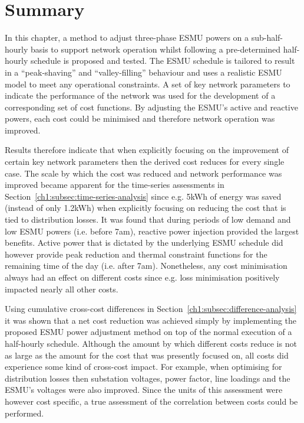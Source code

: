 \section{Summary}
\label{ch1:sec:summary}

In this chapter, a method to adjust three-phase ESMU powers on a sub-half-hourly basis to support network operation whilst following a pre-determined half-hourly schedule is proposed and tested.
The ESMU schedule is tailored to result in a ``peak-shaving'' and ``valley-filling'' behaviour and uses a realistic ESMU model to meet any operational constraints.
A set of key network parameters to indicate the performance of the network was used for the development of a corresponding set of cost functions.
By adjusting the ESMU's active and reactive powers, each cost could be minimised and therefore network operation was improved.

Results therefore indicate that when explicitly focusing on the improvement of certain key network parameters then the derived cost reduces for every single case.
The scale by which the cost was reduced and network performance was improved became apparent for the time-series assessments in Section~\ref{ch1:subsec:time-series-analysis} since e.g. 5kWh of energy was saved (instead of only 1.2kWh) when explicitly focusing on reducing the cost that is tied to distribution losses.
It was found that during periods of low demand and low ESMU powers (i.e. before 7am), reactive power injection provided the largest benefits.
Active power that is dictated by the underlying ESMU schedule did however provide peak reduction and thermal constraint functions for the remaining time of the day (i.e. after 7am).
Nonetheless, any cost minimisation always had an effect on different costs since e.g. loss minimisation positively impacted nearly all other costs.

Using cumulative cross-cost differences in Section~\ref{ch1:subsec:difference-analysis} it was shown that a net cost reduction was achieved simply by implementing the proposed ESMU power adjustment method on top of the normal execution of a half-hourly schedule.
Although the amount by which different costs reduce is not as large as the amount for the cost that was presently focused on, all costs did experience some kind of cross-cost impact.
For example, when optimising for distribution losses then substation voltages, power factor, line loadings and the ESMU's voltages were also improved.
Since the units of this assessment were however cost specific, a true assessment of the correlation between costs could be performed.


